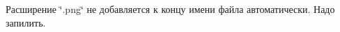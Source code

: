 
\begin{DoxyRefList}
\item[\label{todo__todo000001}%
\hypertarget{todo__todo000001}{}%
Член \hyperlink{class_graph_window_a51f89adcbef5b90b9fdbb24bf7536fe5}{Graph\+Window\+:\+:on\+Save\+Png} ()]Расширение \char`\"{}.\+png\char`\"{} не добавляется к концу имени файла автоматически. Надо запилить. 
\end{DoxyRefList}